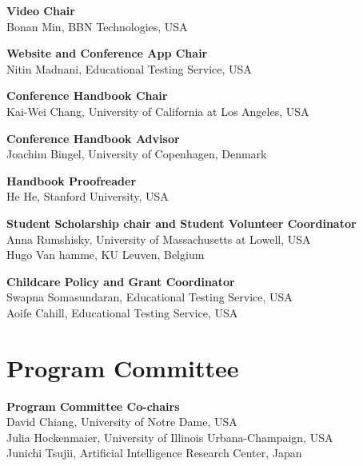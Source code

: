 {\bf Video Chair}\\
Bonan Min, BBN Technologies, USA

{\bf Website and Conference App Chair}\\
Nitin Madnani, Educational Testing Service, USA


{\bf Conference Handbook Chair}\\
Kai-Wei Chang, University of California at Los Angeles, USA

{\bf Conference Handbook Advisor}\\
Joachim Bingel, University of Copenhagen, Denmark

{\bf Handbook Proofreader}\\
He He, Stanford University, USA


{\bf Student Scholarship chair and Student Volunteer Coordinator}\\
Anna Rumshisky, University of Massachusetts at Lowell, USA \\
Hugo Van hamme, KU Leuven, Belgium  

{\bf Childcare Policy and Grant Coordinator }\\
Swapna Somasundaran, Educational Testing Service, USA \\
Aoife Cahill, Educational Testing Service, USA



\clearpage
\section{Program Committee}
\setlength{\parindent}{0pt}

\vspace*{0.5cm}

{\bf Program Committee Co-chairs} \\
David Chiang, University of Notre Dame, USA \\
Julia Hockenmaier, University of Illinois Urbana-Champaign, USA \\
Junichi Tsujii, Artificial Intelligence Research Center, Japan

